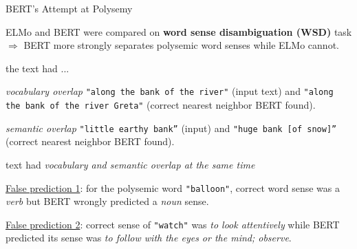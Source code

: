 \begin{frame}{BERT's Attempt at Polysemy}
    
    \vspace{15pt}
    
    \begin{itemizeSpaced}{7pt}
    
        \pinkbox ELMo and BERT were compared on \textbf{word sense disambiguation (WSD)} task $\Rightarrow$ BERT more strongly separates polysemic word senses while ELMo cannot. 
        
         the text had ...
        \vspace{5pt}
        \begin{itemizeSpaced}{7pt}
            \pinkbox \textit{vocabulary overlap}  \texttt{"along the bank of the river"} (input text) and \texttt{"along the bank of the river Greta"} (correct nearest neighbor BERT found). 
            
            \item \textit{semantic overlap} \texttt{"little earthy bank”} (input) and \texttt{"huge bank [of snow]”} (correct nearest neighbor BERT found).
        \end{itemizeSpaced}
        
         text had \emph{vocabulary and semantic overlap at the same time}
        
        \begin{itemizeSpaced}{7pt}
        
            
            \pinkbox \underline{False prediction 1}: for the polysemic word \texttt{"balloon"}, correct word sense was a \emph{verb} but BERT wrongly predicted a \emph{noun} sense.
            
            \item \underline{False prediction 2}: correct sense of \texttt{"watch"} was \emph{to look attentively} while BERT predicted its sense was \emph{to follow with the eyes or the mind; observe}. 
        \end{itemizeSpaced}
        
    \end{itemizeSpaced}
    
\end{frame}